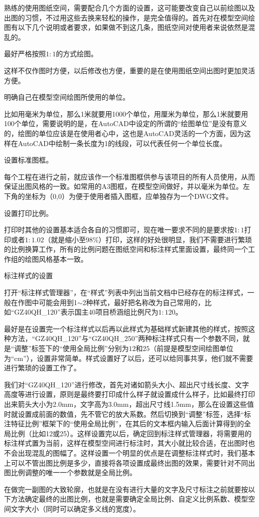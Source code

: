 熟练的使用图纸空间，需要配合几个方面的设置，这可能要改变自己以前绘图以及出图的习惯，不过用这些去换来轻松的操作，是完全值得的。首先对在模型空间绘图有以下几个说明或者要求，如果做不到这几条，图纸空间对使用者来说依然是混乱的。

\begin{compactenum}
\item 最好严格按照$1:1$的方式绘图。

这样不仅作图时方便，以后修改也方便，重要的是在使用图纸空间出图时更加灵活方便。
\item 明确自己在模型空间绘图所使用的单位。

比如用毫米为单位，那么1米就要用1000个单位，用厘米为单位，那么1米就要用100个单位，需要说明的是，在AutoCAD中设定的所谓的“绘图单位”是没有意义的，绘图的单位应该是在使用者心中，这也是AutoCAD灵活的一个方面，因为这样在AutoCAD中绘制一条长度为1的线段，可以代表任何一个单位长度。
\item 设置标准图框。

每个工程在进行之前，就应该作一个标准图框供参与该项目的所有人员使用，从而保证出图风格的一致。如常用的A3图框，在模型空间做好，并以毫米为单位。左下角的坐标为（0,0）为便于使用者插入图框，应单独存为一个DWG文件。
\item 设置打印比例。

打印时其他的设置基本适合各自的习惯即可，现在唯一要求不同的是要求按$1:1$打印或者$1:1.02$（就是缩小至98\%）打印，这样的好处很明显，我们不需要进行繁琐的比例换算工作，所有的比例问题在图纸空间和标注样式里面设置，最终同一个工作组的绘图风格基本一致。
\item 标注样式的设置

打开“标注样式管理器”，在“样式”列表中列出当前文档中已经存在的标注样式，一般在作图中可能会用到1$\sim$2种样式，最好把名称改为自己常用的，比如“GZ40QH\_120”表示国主40项目桥涵组比例尺为$1:120$。

最好是在设置完一个标注样式以后再以此样式为基础样式新建其他的样式，按照这种方法，“GZ40QH\_120”与“GZ40QH\_250”两种标注样式只有一个参数不同，就是“调整”标签下的“使用全局比例”分别为$12$和$25$（前提是模型空间绘图单位为“cm”），设置非常简单。样式设置好了以后，还可以给同事共享，他们就不需要进行繁琐的设置工作了。

我们对“GZ40QH\_120”进行修改，首先对诸如箭头大小、超出尺寸线长度、文字高度等进行设置，原则是最终要打印成什么样子就设置成什么样子，比如最终打印出来箭头大小为2.0mm，文字高为3.0mm，超出尺寸线1.5mm，那么在设置这些值时就设置成前面的数值，先不管它的放大系数。然后切换到“调整”标签，选择“标注特征比例”框架下的“使用全局比例”，在其后的文本框内输入后面计算得到的全局比例（比如12或25）。这样设置完以后，确定回到标注样式管理器，将需要用的标注样式置为当前，这样在模型空间进行标注时，其大小就比较合适，在出图时也不会出现混乱的图幅了。这样设置一个明显的优点是在调整标注样式时，我们基本上可以不管出图比例是多少，直接将各项设置成最终出图的效果，需要针对不同出图比例调整的唯一一个参数就是全局比例。
\item 在做完一副图的大致轮廓，也就是在没有进行大量的文字及尺寸标注之前就要按以下方法确定最终的出图比例，也就是需要确定全局比例、自定义比例系数、模型空间文字大小（同时可以确定多义线的宽度）。


\end{compactenum}
